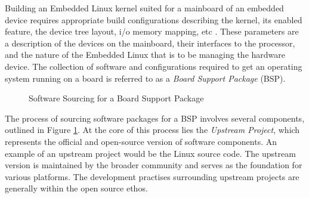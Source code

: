 Building an Embedded Linux kernel suited for a mainboard of an embedded device requires appropriate build configurations describing the kernel, its enabled feature, the device tree layout, i/o memory mapping, etc \cite{bootlin-port}. These parameters are a description of the devices on the mainboard, their interfaces to the processor, and the nature of the Embedded Linux that is to be managing the hardware device. The collection of software and configurations required to get an operating system running on a board is referred to as a \textit{Board Support Package} (BSP).

\begin{figure}[h]
	\centering
	\caption{Software Sourcing for a Board Support Package}
	\label{fig:software-versions}
\end{figure}

The process of sourcing software packages for a BSP involves several components, outlined in Figure \ref{fig:software-versions}. At the core of this process lies the \textit{Upstream Project}, which represents the official and open-source version of software components. An example of an upstream project would be the Linux source code. The upstream version is maintained by the broader community and serves as the foundation for various platforms. The development practises surrounding upstream projects are generally within the open source ethos.

